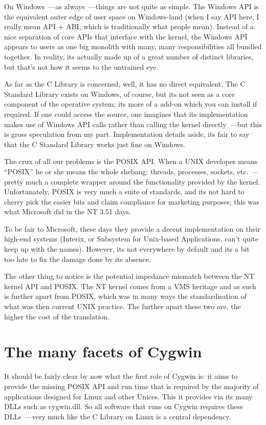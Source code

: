 \documentclass{book}
\begin{document}
On Windows~---as always~---things are not quite as simple. The Windows
API is the equivalent outer edge of user space on Windows-land (when I
say API here, I really mean API + ABI, which is traditionally what
people mean). Instead of a nice separation of core APIs that interface
with the kernel, the Windows API appears to users as one big monolith
with many, many responsibilities all bundled together. In reality, its
actually made up of a great number of distinct libraries, but that's
not how it seems to the untrained eye.

As far as the C Library is concerned, well, it has no direct
equivalent. The C Standard Library exists on Windows, of course, but
its not seen as a core component of the operative system; its more of
a add-on which you can install if required. If one could access the
source, one imagines that its implementation makes use of Windows API
calls rather than calling the kernel directly~---but this is gross
speculation from my part. Implementation details aside, its fair to
say that the C Standard Library works just fine on Windows.

The crux of all our problems is the POSIX API. When a UNIX developer
means ``POSIX'' he or she means the whole shebang: threads, processes,
sockets, etc.~---pretty much a complete wrapper around the
functionality provided by the kernel. Unfortunately, POSIX is very
much a suite of standards, and its not hard to cherry pick the easier
bits and claim compliance for marketing purposes; this was what
Microsoft did in the NT 3.51 days.

To be fair to Microsoft, these days they provide a decent
implementation on their high-end systems (Interix, or Subsystem for
Unix-based Applications, can't quite keep up with the names). However,
its not everywhere by default and its a bit too late to fix the damage
done by its absence.

The other thing to notice is the potential impedance mismatch between
the NT kernel API and POSIX. The NT kernel comes from a VMS heritage
and as such is further apart from POSIX, which was in many ways the
standardisation of what was then current UNIX practice. The further
apart these two are, the higher the cost of the translation.

\section{The many facets of Cygwin}

It should be fairly clear by now what the first role of Cygwin is: it
aims to provide the missing POSIX API and run time that is required by
the majority of applications designed for Linux and other Unices. This
it provides via its many DLLs such as cygwin.dll. So all software that
runs on Cygwin requires these DLLs~---very much like the C Library on
Linux is a central dependency.
\end{document}

